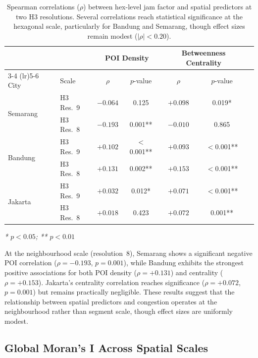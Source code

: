 \documentclass[preprint,12pt]{elsarticle}
\begin{document}
\begin{table}[!htbp]
\centering
\caption{Spearman correlations ($\rho$) between hex-level jam factor and spatial predictors at two H3 resolutions. Several correlations reach statistical significance at the hexagonal scale, particularly for Bandung and Semarang, though effect sizes remain modest ($|\rho| < 0.20$).}
\label{tab:s5}
\begin{tabular}{llccccc}
\toprule
 & & \multicolumn{2}{c}{POI Density} & \multicolumn{2}{c}{Betweenness Centrality} \\
\cmidrule(lr){3-4} \cmidrule(lr){5-6}
City & Scale & $\rho$ & $p$-value & $\rho$ & $p$-value \\
\midrule
\multirow{2}{*}{Semarang}
 & H3 Res.\ 9 & $-0.064$ & 0.125 & $+0.098$ & 0.019* \\
 & H3 Res.\ 8 & $-0.193$ & 0.001** & $-0.010$ & 0.865 \\
\midrule
\multirow{2}{*}{Bandung}
 & H3 Res.\ 9 & $+0.102$ & $<$0.001** & $+0.093$ & $<$0.001** \\
 & H3 Res.\ 8 & $+0.131$ & 0.002** & $+0.153$ & $<$0.001** \\
\midrule
\multirow{2}{*}{Jakarta}
 & H3 Res.\ 9 & $+0.032$ & 0.012* & $+0.071$ & $<$0.001** \\
 & H3 Res.\ 8 & $+0.018$ & 0.423 & $+0.072$ & 0.001** \\
\bottomrule
\end{tabular}

\smallskip
\noindent\textit{* $p < 0.05$; ** $p < 0.01$}
\end{table}

At the neighbourhood scale (resolution~8), Semarang shows a significant negative POI correlation ($\rho = -0.193$, $p = 0.001$), while Bandung exhibits the strongest positive associations for both POI density ($\rho = +0.131$) and centrality ($\rho = +0.153$). Jakarta's centrality correlation reaches significance ($\rho = +0.072$, $p = 0.001$) but remains practically negligible. These results suggest that the relationship between spatial predictors and congestion operates at the neighbourhood rather than segment scale, though effect sizes are uniformly modest.

\subsection{Global Moran's I Across Spatial Scales}
\end{document}
